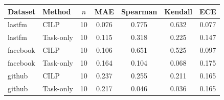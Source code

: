 \begin{tabular}{@{}llccccc@{}}
\toprule
Dataset & Method & $n$ & MAE & Spearman & Kendall & ECE \\
\midrule
lastfm & CILP & 10 & 0.076 & 0.775 & 0.632 & 0.077 \\
lastfm & Task-only & 10 & 0.115 & 0.318 & 0.225 & 0.147 \\
facebook & CILP & 10 & 0.106 & 0.651 & 0.525 & 0.097 \\
facebook & Task-only & 10 & 0.164 & 0.104 & 0.068 & 0.175 \\
github & CILP & 10 & 0.237 & 0.255 & 0.211 & 0.165 \\
github & Task-only & 10 & 0.217 & 0.046 & 0.036 & 0.165 \\
\bottomrule
\end{tabular}

